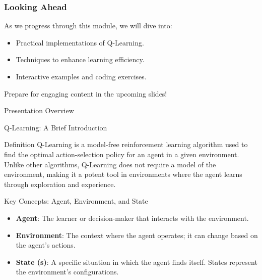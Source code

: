 \documentclass[aspectratio=169]{beamer}
\begin{document}
\begin{frame}[fragile]
    \frametitle{Looking Ahead}
    As we progress through this module, we will dive into:
    \begin{itemize}
        \item Practical implementations of Q-Learning.
        \item Techniques to enhance learning efficiency.
        \item Interactive examples and coding exercises.
    \end{itemize}
    Prepare for engaging content in the upcoming slides!
\end{frame}

\begin{frame}[fragile]{Presentation Overview}
  \tableofcontents[hideallsubsections]
\end{frame}

\begin{frame}[fragile]{Q-Learning: A Brief Introduction}
  \begin{block}{Definition}
    Q-Learning is a model-free reinforcement learning algorithm used to find the optimal action-selection policy for an agent in a given environment. Unlike other algorithms, Q-Learning does not require a model of the environment, making it a potent tool in environments where the agent learns through exploration and experience.
  \end{block}
\end{frame}

\begin{frame}[fragile]{Key Concepts: Agent, Environment, and State}
  \begin{itemize}
    \item \textbf{Agent}: The learner or decision-maker that interacts with the environment.
    \item \textbf{Environment}: The context where the agent operates; it can change based on the agent's actions.
    \item \textbf{State (s)}: A specific situation in which the agent finds itself. States represent the environment's configurations.
  \end{itemize}
\end{frame}
\end{document}
